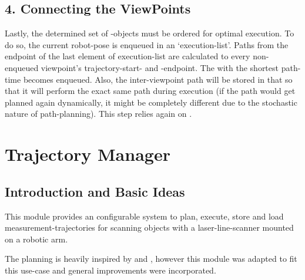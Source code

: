 \documentclass[letterpaper,10pt,english]{sphinxmanual}
\begin{document}
\section{4. Connecting the ViewPoints}
\label{\detokenize{view_planning_detailed:connecting-the-viewpoints}}
Lastly, the determined set of {\hyperref[\detokenize{module_view:viewpoint}]{}}-objects must be ordered for optimal execution. To do so, the current robot-pose is enqueued in an ‘execution-list’.
Paths from the endpoint of the last element of execution-list are calculated to every non-enqueued viewpoint’s trajectory-start- and -endpoint. The {\hyperref[\detokenize{module_view:viewpoint}]{}} with the shortest path-time becomes enqueued.
Also, the inter-viewpoint path will be stored in that {\hyperref[\detokenize{module_view:viewpoint}]{}} so that it will perform the exact same path during execution (if the path would get planned again dynamically,
it might be completely different due to the stochastic nature of path-planning). This step relies again on .


\chapter{Trajectory Manager}
\label{\detokenize{module_trajectory_manager:trajectory-manager}}\label{\detokenize{module_trajectory_manager::doc}}\label{\detokenize{module_trajectory_manager:id1}}

\section{Introduction and Basic Ideas}
\label{\detokenize{module_trajectory_manager:introduction-and-basic-ideas}}
This module provides an configurable system to plan, execute, store and load measurement-trajectories for scanning objects with a laser-line-scanner mounted on a robotic arm.

The planning is heavily inspired by 
and , however this module was adapted to fit this use-case and general improvements were incorporated.
\end{document}
